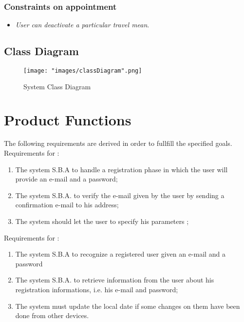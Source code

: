 \subsubsection{Constraints on appointment} \label{subsubsect:constronappoint}
\begin{itemize}
\item \textit{User can deactivate a particular travel mean}.
\end{itemize}

\subsection{Class Diagram}
\begin{figure}[H]
\begin{center}
\texttt{[image: "images/classDiagram".png]}
\caption{System Class Diagram}
\end{center}
\end{figure}

\section{Product Functions}

The following requirements are derived in order to fullfill the specified goals.\\

Requirements for :
\begin{enumerate}%
\renewcommand\labelenumi{\textbf{R\theenumi}}
\item The system S.B.A to handle a registration phase in which the user will provide an e-mail and a password; \label{req:R1}
\item The system S.B.A. to verify the e-mail given by the user by sending a confirmation e-mail to his address; \label{req:R2}
\item  The system should let the user to specify his parameters ;
\end{enumerate} \label{req:R3}

Requirements for :
\begin{enumerate}[resume]
\renewcommand\labelenumi{\textbf{R\theenumi}}
\item The system S.B.A to recognize a registered user given an e-mail and a password \label{req:R4}
\item The system S.B.A. to retrieve information from the user about his registration informations, i.e. his e-mail and password; \label{req:R5}
\item The system must update the local date if some changes on them have been done from other devices. \label{req:R30}
\end{enumerate}

